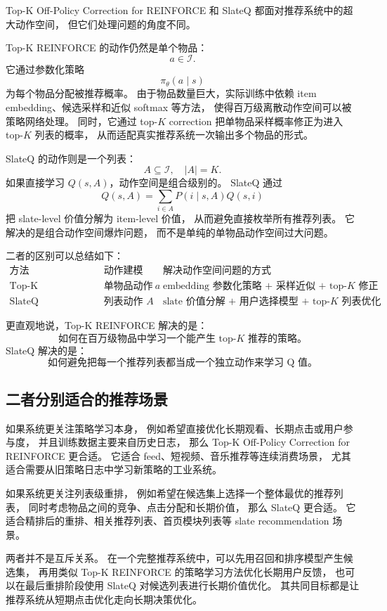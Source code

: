 \documentclass[11pt]{ctexart}
\begin{document}
Top-K Off-Policy Correction for REINFORCE 和 SlateQ 都面对推荐系统中的超大动作空间，
但它们处理问题的角度不同。

Top-K REINFORCE 的动作仍然是单个物品：
\[
a\in\mathcal{I}.
\]
它通过参数化策略
\[
\pi_{\theta}(a\mid s)
\]
为每个物品分配被推荐概率。
由于物品数量巨大，实际训练中依赖 item embedding、候选采样和近似 softmax 等方法，
使得百万级离散动作空间可以被策略网络处理。
同时，它通过 top-$K$ correction 把单物品采样概率修正为进入 top-$K$ 列表的概率，
从而适配真实推荐系统一次输出多个物品的形式。

SlateQ 的动作则是一个列表：
\[
A\subseteq\mathcal{I},\quad |A|=K.
\]
如果直接学习 $Q(s,A)$，动作空间是组合级别的。
SlateQ 通过
\[
Q(s,A)
=
\sum_{i\in A}P(i\mid s,A)Q(s,i)
\]
把 slate-level 价值分解为 item-level 价值，
从而避免直接枚举所有推荐列表。
它解决的是组合动作空间爆炸问题，
而不是单纯的单物品动作空间过大问题。

二者的区别可以总结如下：
\[
\begin{array}{c|c|c}
\text{方法} & \text{动作建模} & \text{解决动作空间问题的方式} \\
\hline
\text{Top-K REINFORCE}
&
\text{单物品动作 } a
&
\text{embedding 参数化策略 + 采样近似 + top-}K\text{ 修正}
\\
\hline
\text{SlateQ}
&
\text{列表动作 } A
&
\text{slate 价值分解 + 用户选择模型 + top-}K\text{ 列表优化}
\end{array}
\]

更直观地说，Top-K REINFORCE 解决的是：
\[
\text{如何在百万级物品中学习一个能产生 top-}K\text{ 推荐的策略。}
\]
SlateQ 解决的是：
\[
\text{如何避免把每一个推荐列表都当成一个独立动作来学习 Q 值。}
\]

\subsection{二者分别适合的推荐场景}

如果系统更关注策略学习本身，
例如希望直接优化长期观看、长期点击或用户参与度，
并且训练数据主要来自历史日志，
那么 Top-K Off-Policy Correction for REINFORCE 更合适。
它适合 feed、短视频、音乐推荐等连续消费场景，
尤其适合需要从旧策略日志中学习新策略的工业系统。

如果系统更关注列表级重排，
例如希望在候选集上选择一个整体最优的推荐列表，
同时考虑物品之间的竞争、点击分配和长期价值，
那么 SlateQ 更合适。
它适合精排后的重排、相关推荐列表、首页模块列表等 slate recommendation 场景。

两者并不是互斥关系。
在一个完整推荐系统中，可以先用召回和排序模型产生候选集，
再用类似 Top-K REINFORCE 的策略学习方法优化长期用户反馈，
也可以在最后重排阶段使用 SlateQ 对候选列表进行长期价值优化。
其共同目标都是让推荐系统从短期点击优化走向长期决策优化。
\end{document}
